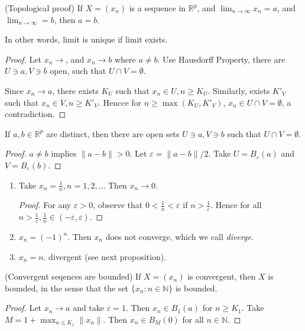\begin{theorem}
	(Topological proof)
	If $X = (x_n)$ is a sequence in $\mathbb{R}^p$, and $\lim_{n \to \infty} x_n = a$, and $\lim_{n \to \infty}  = b$, then $a = b$.

	In other words, limit is unique if limit exists.
\end{theorem}
\begin{proof}
	Let $x_n \to $, and $x_n \to b$ where $a \neq b$. Use Hausdorff Property, there are $U \ni a, V \ni b$ open, such that $U \cap V = \emptyset $.

	Since $x_n \to a$, there exists $K_U $ such that $x_n \in U, n \ge K_U$. Similarly, exists $K'_V $ such that $x_n \in V, n \ge K'_V$. Hencce for $n \ge \max(K_U, K'_V)$, $x_n \in U \cap V = \emptyset $, a contradiction.
\end{proof}


\begin{lemma}
	If $a, b \in \mathbb{R}^p$ are distinct, then there are open sets $U \ni a, V \ni b$ such that $U \cap V = \emptyset $.
\end{lemma}
\begin{proof}
	$a \neq b$ implies $\|a-b\|>0$.
	Let $\varepsilon = \|a-b\|/2$. Take $U = B_\varepsilon(a)$ and $V = B_\varepsilon(b)$.
\end{proof}



\begin{example}
	\begin{enumerate}
		\item Take $x_n = \frac{1}{n}, n = 1,2,\ldots$
			Then $x_n \to  0$. 
			\begin{proof}
			For any $\varepsilon>0$, observe that $0<\frac{1}{n}<\varepsilon$ if $n > \frac{1}{\varepsilon}$. Hence for all $n > \frac{1}{\varepsilon}, \frac{1}{n} \in (-\varepsilon,\varepsilon)$.			\end{proof}
			
		\item $x_n = (-1)^n$. Then $x_n$ does not converge, which we call \textit{diverge}.
		\item $x_n = n$. divergent (see next proposition).
	\end{enumerate}
\end{example}

\begin{theorem}(Convergent seqences are bounded)
	If $X = (x_n)$ is convergent, then $X $ is bounded, in the sense that the set $\{x_n : n \in \mathbb{N}\} $ is bounded.
\end{theorem}
\begin{proof}
	Let $x_n \to a$ and take $\varepsilon = 1$. Then $x_n \in B_1(a)$ for $n \ge K_1$. Take $M = 1 + \max_{n\le K_1} \|x_n\|$. Then $x_n \in B_M(0)$ for all $n \in \mathbb{N}$.
\end{proof}

